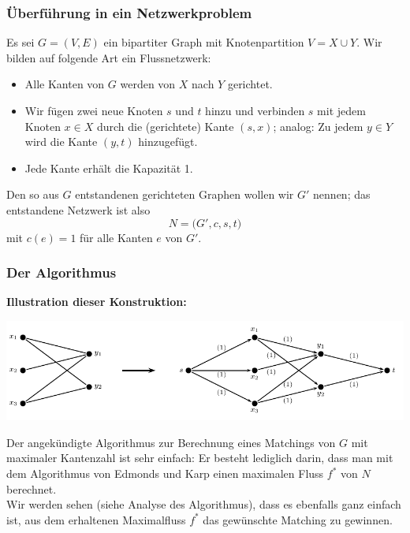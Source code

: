 \documentclass[smaller]{beamer}
\begin{document}
\begin{frame}
 \frametitle{\"Uberführung in ein Netzwerkproblem}
 Es sei $G=(V,E)$ ein bipartiter Graph mit Knotenpartition $V=X \cup Y$. Wir bilden auf folgende Art ein \alert{Flussnetzwerk:}
\begin{itemize}
\item Alle Kanten von $G$ werden von $X$ nach $Y$ gerichtet.
\item Wir fügen zwei neue Knoten $s$ und $t$ hinzu und verbinden $s$ mit jedem Knoten $x \in X$ durch die (gerichtete) Kante $(s,x)$; analog: Zu jedem $y \in Y$ wird die Kante $(y,t)$ hinzugefügt.
\item Jede Kante erhält die Kapazität 1.
\end{itemize} \vspace*{0.2cm}

Den so aus $G$ entstandenen gerichteten Graphen wollen wir $G'$ nennen; das entstandene Netzwerk ist also
\[
N = \big( G', c, s, t \big)
\]\label{page:11:6}
mit $c(e)=1$ für alle Kanten $e$ von $G'$.
\end{frame}

\begin{frame}
\frametitle{Der Algorithmus}
\textbf{Illustration dieser Konstruktion:}
\begin{center}
 \includegraphics[scale=0.8]{fig39.pdf}
\end{center}

\alert{Der angekündigte Algorithmus zur Berechnung eines Matchings von $G$ mit maximaler Kantenzahl ist sehr einfach: Er besteht lediglich darin, dass man mit dem Algorithmus von Edmonds und Karp einen maximalen Fluss $f^*$ von $N$ berechnet}. \\ \vspace*{0.2cm} Wir werden sehen (siehe Analyse des Algorithmus), dass es ebenfalls ganz einfach ist, aus dem erhaltenen Maximalfluss $f^*$ das gewünschte Matching zu gewinnen.
\end{frame}
\end{document}
